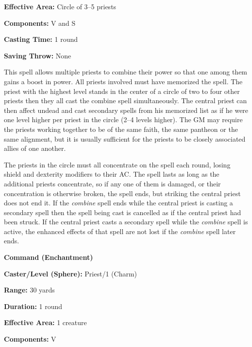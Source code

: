 \begin{multicols}{2}
\begin{minipage}{\columnwidth}
\noindent \textbf{Effective Area:} Circle of 3--5 priests

\noindent \textbf{Components:} V and S

\noindent \textbf{Casting Time:} 1 round

\noindent \textbf{Saving Throw:} None

\end{minipage}

This spell allows multiple priests to combine their power so that one among them gains a boost in power. All priests involved must have memorized the spell.  The priest with the highest level stands in the center of a circle of two to four other priests then they all cast the combine spell simultaneously.  The central priest can then affect undead and cast secondary spells from his memorized list as if he were one level higher per priest in the circle (2--4 levels higher).  The GM may require the priests working together to be of the same faith, the same pantheon or the same alignment, but it is usually sufficient for the priests to be closely associated allies of one another.  

The priests in the circle must all concentrate on the spell each round, losing shield and dexterity modifiers to their AC.  The spell lasts as long as the additional priests concentrate, so if any one of them is damaged, or their concentration is otherwise broken, the spell ends, but striking the central priest does not end it.  If the \textit{combine} spell ends while the central priest is casting a secondary spell then the spell being cast is cancelled as if the central priest had been struck.  If the central priest casts a secondary spell while the \textit{combine} spell is active, the enhanced effects of that spell are not lost if the \textit{combine} spell later ends.

\vspace{1em}

\noindent
\begin{minipage}{\columnwidth}

\noindent \textbf{Command (Enchantment)}

\noindent \textbf{Caster/Level (Sphere):} Priest/1 (Charm)

\noindent \textbf{Range:} 30 yards

\noindent \textbf{Duration:} 1 round

\noindent \textbf{Effective Area:} 1 creature

\noindent \textbf{Components:} V


\end{minipage}
\end{multicols}
